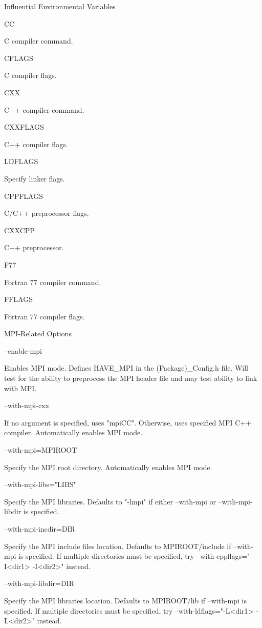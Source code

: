 \documentclass[12pt,relax]{TrilinosDevGuide}
\begin{document}
\triangleright Influential Environmental Variables

\bullet CC 

C compiler command.

\bullet CFLAGS 

C compiler flags.

\bullet CXX 

C++ compiler command.

\bullet CXXFLAGS 

C++ compiler flags.

\bullet LDFLAGS 

Specify linker flags.

\bullet CPPFLAGS 

C/C++ preprocessor flags.

\bullet CXXCPP 

C++ preprocessor.

\bullet F77 

Fortran 77 compiler command.

\bullet FFLAGS 

Fortran 77 compiler flags.

\triangleright MPI-Related Options

\bullet --enable-mpi 

Enables MPI mode. Defines HAVE_MPI in the (Package)_Config.h file. Will test 
for the ability to preprocess the MPI header file and may test ability to link 
with MPI.

\bullet --with-mpi-cxx 

If no argument is specified, uses "mpiCC". Otherwise, uses specified MPI C++
compiler. Automatically enables MPI mode. 

\bullet --with-mpi=MPIROOT 

Specify the MPI root directory. Automatically enables MPI mode. 

\bullet --with-mpi-libs="LIBS" 

Specify the MPI libraries. Defaults to "-lmpi" if either --with-mpi or 
--with-mpi-libdir is specified.

\bullet --with-mpi-incdir=DIR

Specify the MPI include files location. Defaults to MPIROOT/include if 
--with-mpi is specified. If multiple directories  must be specified, try 
--with-cppflags="-I<dir1> -I<dir2>" instead.

\bullet --with-mpi-libdir=DIR 

Specify the MPI libraries location. Defaults to MPIROOT/lib if --with-mpi 
is specified. If multiple directories must be specified, try 
--with-ldflags="-L<dir1> -L<dir2>" instead. 
\end{document}
